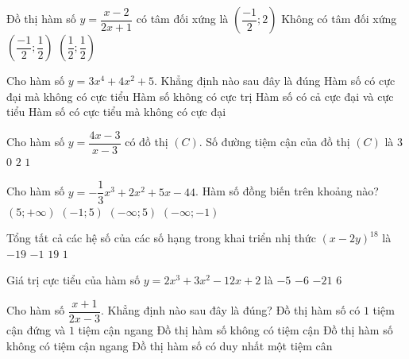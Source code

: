 \begin{ex}%
Đồ thị hàm số $y=\dfrac{x-2}{2x+1}$ có tâm đối xứng là
\choice
{$\left( \dfrac{-1}{2}; 2\right)$}
{Không có tâm đối xứng}
{\True $\left( \dfrac{-1}{2}; \dfrac{1}{2}\right)$}
{$\left( \dfrac{1}{2}; \dfrac{1}{2}\right)$}
\end{ex}

\begin{ex}%
Cho hàm số $y=3x^4+4x^2+5$. Khẳng định nào sau đây là đúng
\choice
{Hàm số có cực đại mà không có cực tiểu}
{Hàm số không có cực trị}
{Hàm số có cả cực đại và cực tiểu}
{\True Hàm số có cực tiểu mà không có cực đại}
\end{ex}

\begin{ex}%
Cho hàm số $y=\dfrac{4x-3}{x-3}$ có đồ thị $(C)$. Số đường tiệm cận của đồ thị $(C)$ là
\choice
{$3$}
{$0$}
{\True $2$}
{$1$}
\end{ex}

\begin{ex}%
Cho hàm số $y=-\dfrac{1}{3}x^3+2x^2+5x-44$. Hàm số đồng biến trên khoảng nào?
\choice
{$(5; +\infty)$}
{\True$(-1; 5)$}
{$(-\infty; 5)$}
{ $(-\infty; -1)$}
\end{ex}

\begin{ex}%
Tổng tất cả các hệ số của các số hạng trong khai triển nhị thức $(x-2y)^{18}$ là
\choice
{$-19$}
{$-1$}
{$19$}
{\True$1$}
\end{ex}

\begin{ex}%
Giá trị cực tiểu của hàm số $y=2x^3+3x^2-12x+2$ là
\choice
{\True $-5$}
{$-6$}
{$-21$}
{$6$}
\end{ex}

\begin{ex}%
Cho hàm số $\dfrac{x+1}{2x-3}.$ Khẳng định nào sau đây là đúng?
\choice
{\True Đồ thị hàm số có $1$ tiệm cận đứng và $1$ tiệm cận ngang}
{Đồ thị hàm số không có tiệm cận}
{Đồ thị hàm số không có tiệm cận ngang}
{Đồ thị hàm số có duy nhất một tiệm cân}
\end{ex}


